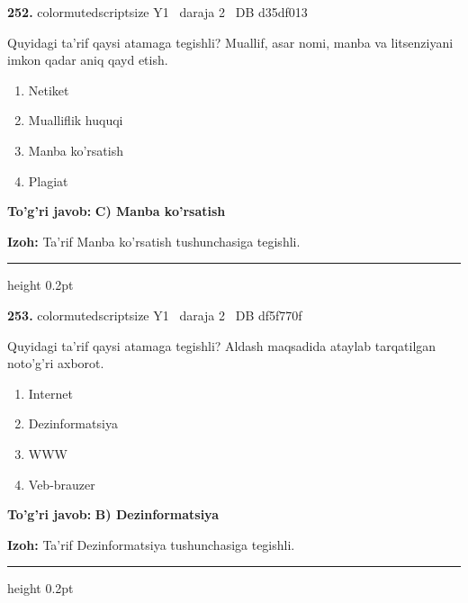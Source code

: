 \documentclass[10pt,a4paper,oneside]{article}
\begin{document}
\noindent\textbf{\color{ink}252.}  {color{muted}scriptsize Y1 \textbullet\ daraja 2 \textbullet\ DB d35df013}
\par
Quyidagi ta'rif qaysi atamaga tegishli? Muallif, asar nomi, manba va litsenziyani imkon qadar aniq qayd etish.
\begin{enumerate}[label=\Alph*),leftmargin=9mm]
\item Netiket
\item Mualliflik huquqi
\item Manba ko'rsatish
\item Plagiat
\end{enumerate}
\begin{tcolorbox}[enhanced,breakable,colback=teal!4,colframe=teal!50!black,boxrule=0.5pt,arc=1.1mm,left=3mm,right=3mm,top=1.7mm,bottom=1.7mm,before skip=2mm,after skip=2mm]
\textbf{\color{teal}To'g'ri javob:} \textbf{C) Manba ko'rsatish}
\par\smallskip
\textbf{Izoh:} Ta'rif Manba ko'rsatish tushunchasiga tegishli.
\end{tcolorbox}
\vspace{2mm}\hrule height 0.2pt \vspace{3mm}

\noindent\textbf{\color{ink}253.}  {color{muted}scriptsize Y1 \textbullet\ daraja 2 \textbullet\ DB df5f770f}
\par
Quyidagi ta'rif qaysi atamaga tegishli? Aldash maqsadida ataylab tarqatilgan noto'g'ri axborot.
\begin{enumerate}[label=\Alph*),leftmargin=9mm]
\item Internet
\item Dezinformatsiya
\item WWW
\item Veb-brauzer
\end{enumerate}
\begin{tcolorbox}[enhanced,breakable,colback=teal!4,colframe=teal!50!black,boxrule=0.5pt,arc=1.1mm,left=3mm,right=3mm,top=1.7mm,bottom=1.7mm,before skip=2mm,after skip=2mm]
\textbf{\color{teal}To'g'ri javob:} \textbf{B) Dezinformatsiya}
\par\smallskip
\textbf{Izoh:} Ta'rif Dezinformatsiya tushunchasiga tegishli.
\end{tcolorbox}
\vspace{2mm}\hrule height 0.2pt \vspace{3mm}
\end{document}
